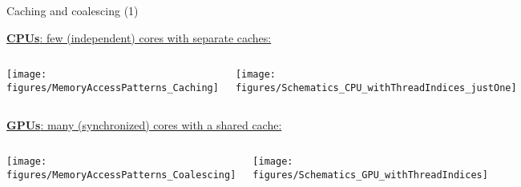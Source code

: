 \ifmedium
\begin{frame}[fragile]{Caching and coalescing (1)}

  \ul{\textbf{CPUs}: few (independent) cores with separate caches:}

  \vspace{-10pt}

  \begin{columns}[t,onlytextwidth]
      \begin{center}
        \texttt{[image: figures/MemoryAccessPatterns\_Caching]}
      \end{center}
      \begin{center}
        \texttt{[image: figures/Schematics\_CPU\_withThreadIndices\_justOne]}
      \end{center}
  \end{columns}

  \vspace{5pt}
  \pause

  \ul{\textbf{GPUs}: many (synchronized) cores with a shared cache:}

  \vspace{-10pt}

  \begin{columns}[t,onlytextwidth]
      \begin{center}
        \texttt{[image: figures/MemoryAccessPatterns\_Coalescing]}
      \end{center}
      \begin{center}
        \texttt{[image: figures/Schematics\_GPU\_withThreadIndices]}
      \end{center}
  \end{columns}

\end{frame}
\fi


